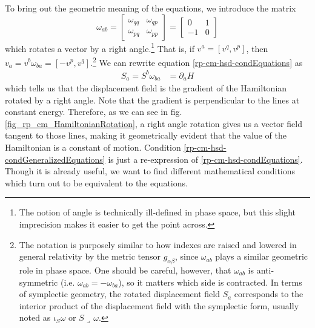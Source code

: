 To bring out the geometric meaning of the equations, we introduce the matrix
\begin{equation}\label{rp-cm-symplectic1d}
	\tag{SF-1D}
	\omega_{ab} = \left[\begin{array}{cc}
		\omega_{qq} & \omega_{qp} \\
		\omega_{pq} & \omega_{pp} 
	\end{array} \right]= \left[\begin{array}{cc}
		0 & 1 \\
		-1 & 0 
	\end{array} \right]
\end{equation}
which rotates a vector by a right angle.\footnote{The notion of angle is technically ill-defined in phase space, but this slight imprecision makes it easier to get the point across.} That is, if $v^a = [v^q, v^p]$, then $v_a = v^b \omega_{ba}  = [-v^p, v^q]$.\footnote{The notation is purposely similar to how indexes are raised and lowered in general relativity by the metric tensor $g_{\alpha\beta}$, since $\omega_{ab}$ plays a similar geometric role in phase space. One should be careful, however, that $\omega_{ab}$ is anti-symmetric (i.e. $\omega_{ab} = - \omega_{ba}$), so it matters which side is contracted. In terms of symplectic geometry, the rotated displacement field $S_a$ corresponds to the interior product of the displacement field with the symplectic form, usually noted as $\iota_S \omega$ or $S \lrcorner \, \omega$.} We can rewrite equation \ref{rp-cm-hsd-condEquations} as
\begin{equation}\label{rp-cm-hsd-condGeneralizedEquations}
	\tag{HM-G}
	\begin{aligned}
		S_a = S^b \omega_{ba} &= \partial_a H 
	\end{aligned}
\end{equation}
which tells us that the displacement field is the gradient of the Hamiltonian rotated by a right angle. Note that the gradient is perpendicular to the lines at constant energy. Therefore, as we can see in fig. \ref{fig_rp_cm_HamiltonianRotation}, a right angle rotation gives us a vector field tangent to those lines, making it geometrically evident that the value of the Hamiltonian is a constant of motion. Condition \ref{rp-cm-hsd-condGeneralizedEquations} is just a re-expression of \ref{rp-cm-hsd-condEquations}. Though it is already useful, we want to find different mathematical conditions which turn out to be equivalent to the equations.

